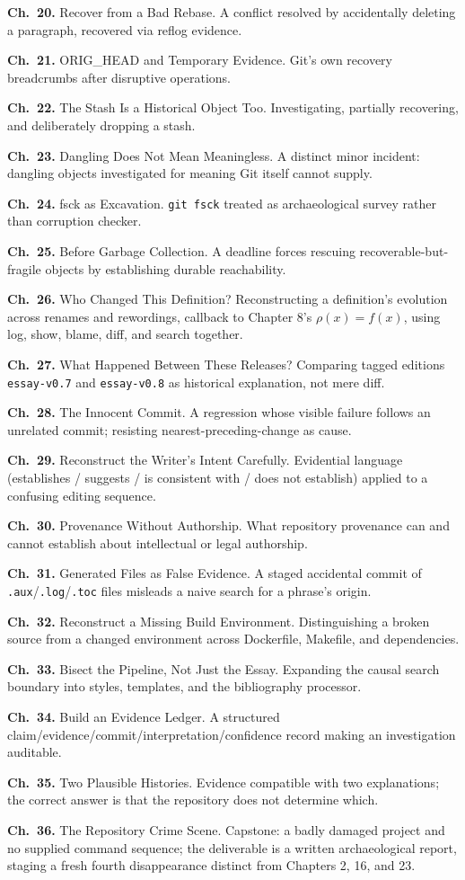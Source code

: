 \documentclass[11pt]{book}
\newcommand{\chapentry}[2]{\noindent\textbf{Ch.~#1.} #2\par\smallskip}
\begin{document}
\chapentry{20}{Recover from a Bad Rebase. A conflict resolved by accidentally deleting a paragraph, recovered via reflog evidence.}
\chapentry{21}{ORIG\_HEAD and Temporary Evidence. Git's own recovery breadcrumbs after disruptive operations.}
\chapentry{22}{The Stash Is a Historical Object Too. Investigating, partially recovering, and deliberately dropping a stash.}
\chapentry{23}{Dangling Does Not Mean Meaningless. A distinct minor incident: dangling objects investigated for meaning Git itself cannot supply.}
\chapentry{24}{fsck as Excavation. \texttt{git fsck} treated as archaeological survey rather than corruption checker.}
\chapentry{25}{Before Garbage Collection. A deadline forces rescuing recoverable-but-fragile objects by establishing durable reachability.}
\chapentry{26}{Who Changed This Definition? Reconstructing a definition's evolution across renames and rewordings, callback to Chapter 8's $\rho(x)=f(x)$, using log, show, blame, diff, and search together.}
\chapentry{27}{What Happened Between These Releases? Comparing tagged editions \texttt{essay-v0.7} and \texttt{essay-v0.8} as historical explanation, not mere diff.}
\chapentry{28}{The Innocent Commit. A regression whose visible failure follows an unrelated commit; resisting nearest-preceding-change as cause.}
\chapentry{29}{Reconstruct the Writer's Intent Carefully. Evidential language (establishes / suggests / is consistent with / does not establish) applied to a confusing editing sequence.}
\chapentry{30}{Provenance Without Authorship. What repository provenance can and cannot establish about intellectual or legal authorship.}
\chapentry{31}{Generated Files as False Evidence. A staged accidental commit of \texttt{.aux}/\texttt{.log}/\texttt{.toc} files misleads a naive search for a phrase's origin.}
\chapentry{32}{Reconstruct a Missing Build Environment. Distinguishing a broken source from a changed environment across Dockerfile, Makefile, and dependencies.}
\chapentry{33}{Bisect the Pipeline, Not Just the Essay. Expanding the causal search boundary into styles, templates, and the bibliography processor.}
\chapentry{34}{Build an Evidence Ledger. A structured claim/evidence/commit/interpretation/confidence record making an investigation auditable.}
\chapentry{35}{Two Plausible Histories. Evidence compatible with two explanations; the correct answer is that the repository does not determine which.}
\chapentry{36}{The Repository Crime Scene. Capstone: a badly damaged project and no supplied command sequence; the deliverable is a written archaeological report, staging a fresh fourth disappearance distinct from Chapters 2, 16, and 23.}
\end{document}
